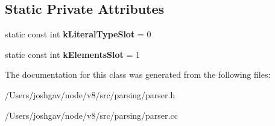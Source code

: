 \subsection*{Static Private Attributes}
\begin{DoxyCompactItemize}
\item 
static const int {\bfseries k\+Literal\+Type\+Slot} = 0\hypertarget{classv8_1_1internal_1_1_compile_time_value_a74b3188f95a68d9897c16ca72a9ea3bf}{}\label{classv8_1_1internal_1_1_compile_time_value_a74b3188f95a68d9897c16ca72a9ea3bf}

\item 
static const int {\bfseries k\+Elements\+Slot} = 1\hypertarget{classv8_1_1internal_1_1_compile_time_value_a88cc697a8edebd987cf9164fbc0b09ae}{}\label{classv8_1_1internal_1_1_compile_time_value_a88cc697a8edebd987cf9164fbc0b09ae}

\end{DoxyCompactItemize}


The documentation for this class was generated from the following files\+:\begin{DoxyCompactItemize}
\item 
/\+Users/joshgav/node/v8/src/parsing/parser.\+h\item 
/\+Users/joshgav/node/v8/src/parsing/parser.\+cc\end{DoxyCompactItemize}
